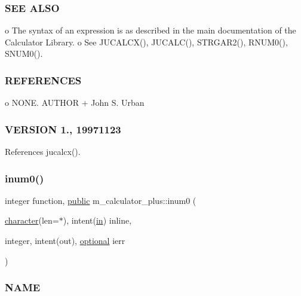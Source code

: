 \subsubsection*{S\+EE A\+L\+SO}

\begin{DoxyVerb}   o The syntax of an expression is as described in the main documentation of the Calculator Library.
   o See JUCALCX(), JUCALC(), STRGAR2(), RNUM0(), SNUM0().
\end{DoxyVerb}


\subsubsection*{R\+E\+F\+E\+R\+E\+N\+C\+ES}

o N\+O\+NE. A\+U\+T\+H\+OR + John S. Urban \subsubsection*{V\+E\+R\+S\+I\+ON 1., 19971123}

References jucalcx().

\mbox{\label{namespacem__calculator__plus_a3edbf94f311a3fad4a83fd8dfe26a61a}} 
\subsubsection{\texorpdfstring{inum0()}{inum0()}}
{\footnotesize\ttfamily integer function, \hyperlink{M__stopwatch_83_8txt_a2f74811300c361e53b430611a7d1769f}{public} m\+\_\+calculator\+\_\+plus\+::inum0 (\begin{DoxyParamCaption}\item[{\hyperlink{option__stopwatch_83_8txt_abd4b21fbbd175834027b5224bfe97e66}{character}(len=$\ast$), intent(\hyperlink{M__journal_83_8txt_afce72651d1eed785a2132bee863b2f38}{in})}]{inline,  }\item[{integer, intent(out), \hyperlink{option__stopwatch_83_8txt_aa4ece75e7acf58a4843f70fe18c3ade5}{optional}}]{ierr }\end{DoxyParamCaption})}



\subsubsection*{N\+A\+ME}


